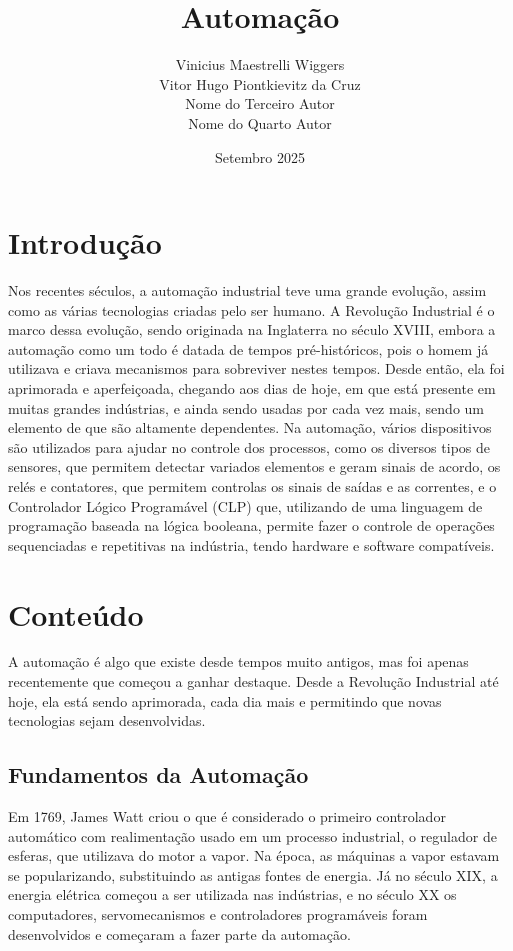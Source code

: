 \documentclass{article}
\title{Automação}
\author{%
	Vinicius Maestrelli Wiggers\\[0.5em]
	Vitor Hugo Piontkievitz da Cruz\\[0.5em]
	Nome do Terceiro Autor\\[0.5em]
	Nome do Quarto Autor
}
\date{Setembro 2025}
\begin{document}
\maketitle

\section{Introdução}

Nos recentes séculos, a automação industrial teve uma grande evolução, assim como as várias tecnologias criadas pelo ser humano. A Revolução Industrial é o marco dessa evolução, sendo originada na Inglaterra no século XVIII, embora a automação como um todo é datada de tempos pré-históricos, pois o homem já utilizava e criava mecanismos para sobreviver nestes tempos. Desde então, ela foi aprimorada e aperfeiçoada, chegando aos dias de hoje, em que está presente em muitas grandes indústrias, e ainda sendo usadas por cada vez mais, sendo um elemento de que são altamente dependentes. Na automação, vários dispositivos são utilizados para ajudar no controle dos processos, como os diversos tipos de sensores, que permitem detectar variados elementos e geram sinais de acordo, os relés e contatores, que permitem controlas os sinais de saídas e as correntes, e o Controlador Lógico Programável (CLP) que, utilizando de uma linguagem de programação baseada na lógica booleana, permite fazer o controle de operações sequenciadas e repetitivas na indústria, tendo hardware e software compatíveis.  

\section{Conteúdo}

A automação é algo que existe desde tempos muito antigos, mas foi apenas recentemente que começou a ganhar destaque. Desde a Revolução Industrial até hoje, ela está sendo aprimorada, cada dia mais e permitindo que novas tecnologias sejam desenvolvidas.

\subsection{Fundamentos da Automação}

Em 1769, James Watt criou o que é considerado o primeiro controlador automático com realimentação usado em um processo industrial, o regulador de esferas, que utilizava do motor a vapor. Na época, as máquinas a vapor estavam se popularizando, substituindo as antigas fontes de energia. Já no século XIX, a energia elétrica começou a ser utilizada nas indústrias, e no século XX os computadores, servomecanismos e controladores programáveis foram desenvolvidos e começaram a fazer parte da automação. 
\end{document}
